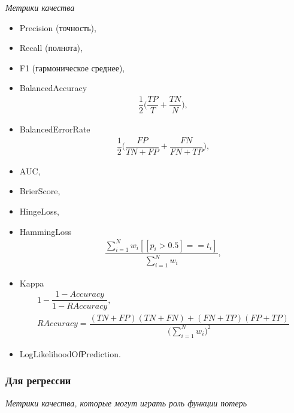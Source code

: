 \documentclass[%
	11pt,
	a4paper,
	utf8,
		]{article}
\begin{document}
\emph{Метрики качества}
\begin{itemize}
	\item Precision (точность),
	
	\item Recall (полнота),
	
	\item F1 (гармоническое среднее),
	
	\item BalancedAccuracy
\begin{align*}
	\dfrac{1}{2} \Big( \dfrac{TP}{T} + \dfrac{TN}{N} \Big),
\end{align*}

    \item BalancedErrorRate
\begin{align*}
	\dfrac{1}{2} \Big( \dfrac{FP}{TN + FP} + \dfrac{FN}{FN + TP} \Big),
\end{align*}

    \item AUC,
    
    \item BrierScore,
    
    \item HingeLoss,
    
    \item HammingLoss
\begin{align*}
	\dfrac{ \sum\limits_{i=1}^{N} w_i [[p_i > 0.5] == t_i] }{ \sum\limits_{i=1}^{N} w_i},
\end{align*}

    \item Kappa
\begin{align*}
	1 - \dfrac{1 - Accuracy}{1 - RAccuracy},\\
	RAccuracy = \dfrac{ (TN + FP) (TN + FN) + (FN + TP)(FP + TP) }{ \Big( \sum\limits_{i=1}^{N} w_i \Big)^2 }
\end{align*}

    \item LogLikelihoodOfPrediction.
\end{itemize}

\subsubsection{Для регрессии}

\emph{Метрики качества, которые могут играть роль функции потерь}
\end{document}
